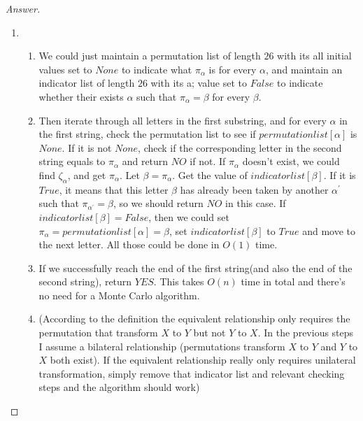 \documentclass{article}
\theoremstyle{plain}
\newenvironment{answer}[1][Answer]
    {\begin{proof}[#1]{$ $}\renewcommand\qedsymbol{$\vartriangle$}}
    {\end{proof}}
\begin{document}
\begin{answer}
\begin{enumerate}
\begin{enumerate}
        \end{enumerate}
        \item
        \begin{enumerate}
            \item
            We could just maintain a permutation list of length $26$ with its all initial values set to $None$ to indicate what $\pi_\alpha$ is for every $\alpha$, and maintain an indicator list of length $26$ with its a; value set to $False$ to indicate whether their exists $\alpha$ such that $\pi_\alpha = \beta$ for every $\beta$.
            \item
            Then iterate through all letters in the first substring, and for every $\alpha$ in the first string, check the permutation list to see if $permutationlist[\alpha]$ is $None$. If it is not $None$, check if the corresponding letter in the second string equals to $\pi_\alpha$ and return $NO$ if not. If $\pi_\alpha$ doesn't exist, we could find $\zeta_\alpha$, and get $\pi_\alpha$. Let $\beta = \pi_\alpha$. Get the value of $indicatorlist[\beta]$. If it is $True$, it means that this letter $\beta$ has already been taken by another $\alpha^\prime$ such that $\pi_{\alpha^\prime} = \beta$, so we should return $NO$ in this case. If $indicatorlist[\beta] = False$, then we could set $\pi_\alpha = permutationlist[\alpha] = \beta$, set $indicatorlist[\beta]$ to $True$ and move to the next letter. All those could be done in $O(1)$ time.
            \item
            If we successfully reach the end of the first string(and also the end of the second string), return $YES$. This takes $O(n)$ time in total and there's no need for a Monte Carlo algorithm.
            \item
            (According to the definition the equivalent relationship only requires the permutation that transform $X$ to $Y$ but not $Y$ to $X$. In the previous steps I assume a bilateral relationship (permutations transform $X$ to $Y$ and $Y$ to $X$ both exist). If the equivalent relationship really only requires unilateral transformation, simply remove that indicator list and relevant checking steps and the algorithm should work)
        \end{enumerate}

    \end{enumerate}
\end{answer}
\end{document}
